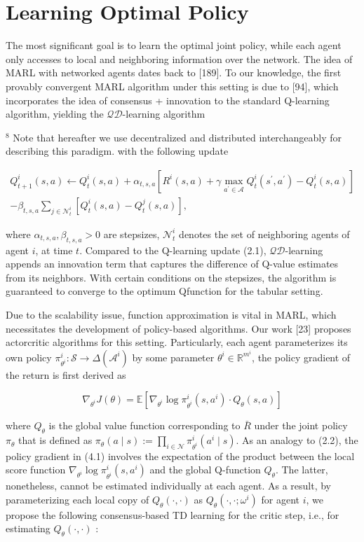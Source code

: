 \documentclass[10pt]{article}
\begin{document}
\section{Learning Optimal Policy}
The most significant goal is to learn the optimal joint policy, while each agent only accesses to local and neighboring information over the network. The idea of MARL with networked agents dates back to [189]. To our knowledge, the first provably convergent MARL algorithm under this setting is due to [94], which incorporates the idea of consensus + innovation to the standard Q-learning algorithm, yielding the $\mathcal{Q D}$-learning algorithm

${ }^{8}$ Note that hereafter we use decentralized and distributed interchangeably for describing this paradigm. with the following update

\[
\begin{gathered}
Q_{t+1}^{i}(s, a) \leftarrow Q_{t}^{i}(s, a)+\alpha_{t, s, a}\left[R^{i}(s, a)+\gamma \max _{a^{\prime} \in \mathcal{A}} Q_{t}^{i}\left(s^{\prime}, a^{\prime}\right)-Q_{t}^{i}(s, a)\right] \\
-\beta_{t, s, a} \sum_{j \in \mathcal{N}_{t}^{i}}\left[Q_{t}^{i}(s, a)-Q_{t}^{j}(s, a)\right],
\end{gathered}
\]

where $\alpha_{t, s, a}, \beta_{t, s, a}>0$ are stepsizes, $\mathcal{N}_{t}^{i}$ denotes the set of neighboring agents of agent $i$, at time $t$. Compared to the Q-learning update (2.1), $\mathcal{Q} \mathcal{D}$-learning appends an innovation term that captures the difference of Q-value estimates from its neighbors. With certain conditions on the stepsizes, the algorithm is guaranteed to converge to the optimum Qfunction for the tabular setting.

Due to the scalability issue, function approximation is vital in MARL, which necessitates the development of policy-based algorithms. Our work [23] proposes actorcritic algorithms for this setting. Particularly, each agent parameterizes its own policy $\pi_{\theta^{i}}^{i}: \mathcal{S} \rightarrow \Delta\left(\mathcal{A}^{i}\right)$ by some parameter $\theta^{i} \in \mathbb{R}^{m^{i}}$, the policy gradient of the return is first derived as

\[
\nabla_{\theta^{i}} J(\theta)=\mathbb{E}\left[\nabla_{\theta^{i}} \log \pi_{\theta^{i}}^{i}\left(s, a^{i}\right) \cdot Q_{\theta}(s, a)\right]
\]

where $Q_{\theta}$ is the global value function corresponding to $\bar{R}$ under the joint policy $\pi_{\theta}$ that is defined as $\pi_{\theta}(a \mid s):=\prod_{i \in \mathcal{N}} \pi_{\theta^{i}}^{i}\left(a^{i} \mid s\right)$. As an analogy to (2.2), the policy gradient in (4.1) involves the expectation of the product between the local score function $\nabla_{\theta^{i}} \log \pi_{\theta^{i}}^{i}\left(s, a^{i}\right)$ and the global Q-function $Q_{\theta}$. The latter, nonetheless, cannot be estimated individually at each agent. As a result, by parameterizing each local copy of $Q_{\theta}(\cdot, \cdot)$ as $Q_{\theta}\left(\cdot, \cdot ; \omega^{i}\right)$ for agent $i$, we propose the following consensus-based TD learning for the critic step, i.e., for estimating $Q_{\theta}(\cdot, \cdot)$ :
\end{document}
